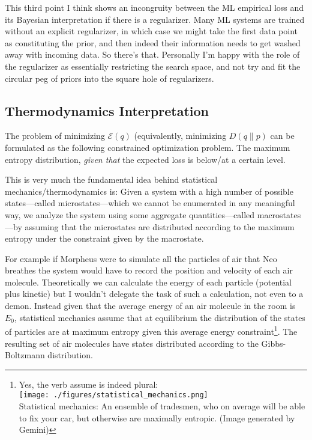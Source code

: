 \documentclass[12pt]{amsart}
\begin{document}
This third point I think shows an incongruity between the ML empirical loss and its Bayesian interpretation if there is a regularizer. Many ML systems are trained without an explicit regularizer, in which case we might take the first data point as constituting the prior, and then indeed their information needs to get washed away with incoming data. So there's that. Personally I'm happy with the role of the regularizer as essentially restricting the search space, and not try and fit the circular peg of priors into the square hole of regularizers.

\subsection*{Thermodynamics Interpretation}

The problem of minimizing $\mathcal{E}(q)$ (equivalently, minimizing $D(q\|p)$ can be formulated as the following constrained optimization problem. The maximum entropy distribution, \emph{given that} the expected loss is below/at a certain level.

This is very much the fundamental idea behind statistical mechanics/thermodynamics is: Given a system with a high number of possible states---called microstates---which we cannot be enumerated in any meaningful way, we analyze the system using some aggregate quantities---called macrostates---by assuming that the microstates are distributed according to the maximum entropy under the constraint given by the macrostate. 

For example if Morpheus were to simulate all the particles of air that Neo breathes the system would have to record the position and velocity of each air molecule. Theoretically we can calculate the energy of each particle (potential plus kinetic) but I wouldn't delegate the task of such a calculation, not even to a demon. Instead given that the average energy of an air molecule in the room is $E_0$, statistical mechanics assume that at equilibrium the distribution of the states of particles are at maximum entropy given this average energy constraint\footnote{Yes, the verb assume is indeed plural:\\ \texttt{[image: ./figures/statistical\_mechanics.png]} \\Statistical mechanics: An ensemble of tradesmen, who on average will be able to fix your car, but otherwise are maximally entropic. \tiny{(Image generated by Gemini)}}. The resulting set of air molecules have states distributed according to the Gibbs-Boltzmann distribution. 
\end{document}
